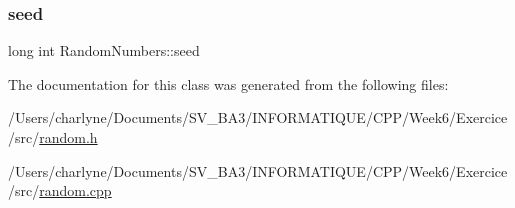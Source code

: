 \mbox{\label{classRandomNumbers_a83c563bc5ca60f2e5c149244b327d948}} 
\subsubsection{\texorpdfstring{seed}{seed}}
{\footnotesize\ttfamily long int Random\+Numbers\+::seed\hspace{0.3cm}{\ttfamily [private]}}



The documentation for this class was generated from the following files\+:\begin{DoxyCompactItemize}
\item 
/\+Users/charlyne/\+Documents/\+S\+V\+\_\+\+B\+A3/\+I\+N\+F\+O\+R\+M\+A\+T\+I\+Q\+U\+E/\+C\+P\+P/\+Week6/\+Exercice/src/\mbox{\hyperlink{random_8h}{random.\+h}}\item 
/\+Users/charlyne/\+Documents/\+S\+V\+\_\+\+B\+A3/\+I\+N\+F\+O\+R\+M\+A\+T\+I\+Q\+U\+E/\+C\+P\+P/\+Week6/\+Exercice/src/\mbox{\hyperlink{random_8cpp}{random.\+cpp}}\end{DoxyCompactItemize}
